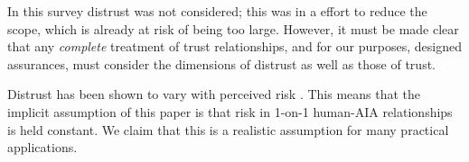 
    In this survey distrust was not considered; this was in a effort to reduce the scope, which is already at risk of being too large. However, it must be made clear that any \emph{complete} treatment of trust relationships, and for our purposes, designed assurances, must consider the dimensions of distrust as well as those of trust. 
    
    Distrust has been shown to vary with perceived risk \cite{McKnight2004-vv}. This means that the implicit assumption of this paper is that risk in 1-on-1 human-AIA relationships is held constant. We claim that this is a realistic assumption for many practical applications.

